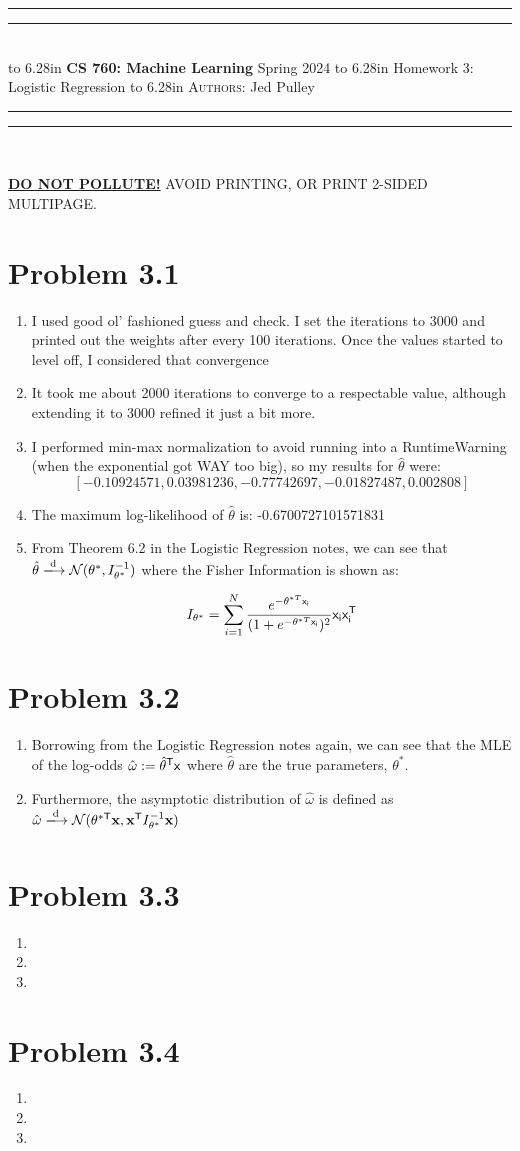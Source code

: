 \documentclass{article}
\newcommand{\lecture}[2]{
\pagestyle{myheadings}
\thispagestyle{plain}
\newpage
\noindent
\begin{center}
\rule{\textwidth}{1.6pt}\vspace*{-\baselineskip}\vspace*{2pt} %
\rule{\textwidth}{0.4pt}\\[1\baselineskip] %
\vbox{\vspace{2mm}
\hbox to 6.28in { {\bf CS 760: Machine Learning} \hfill Spring 2024 }
\vspace{4mm}
\hbox to 6.28in { {\Large \hfill #1  \hfill} }
\vspace{4mm}
\hbox to 6.28in { {\scshape Authors:}  #2 \hfill }}
\vspace{-2mm}
\rule{\textwidth}{0.4pt}\vspace*{-\baselineskip}\vspace{3.2pt} %
\rule{\textwidth}{1.6pt}\\[\baselineskip] %
\end{center}
\vspace*{4mm}
}
\begin{document}
\lecture{Homework 3: Logistic Regression}{Jed Pulley}

\begin{center}
{\Large {\sf \underline{\textbf{DO NOT POLLUTE!}} AVOID PRINTING, OR PRINT 2-SIDED MULTIPAGE.}}
\end{center}

\section*{Problem 3.1}
\begin{enumerate}[label=(\alph*)]
  \item I used good ol' fashioned guess and check. I set the iterations to 3000 and printed out the weights after every 100 iterations. Once the values started to level off, I considered that convergence
  \item It took me about 2000 iterations to converge to a respectable value, although extending it to 3000 refined it just a bit more.
  \item I performed min-max normalization to avoid running into a RuntimeWarning (when the exponential got WAY too big), so my results for $\hat{\theta}$ were: \[[-0.10924571, 0.03981236, -0.77742697, -0.01827487, 0.002808]\]
  \item The maximum log-likelihood of $\hat{\theta}$ is: -0.6700727101571831
  \item From Theorem 6.2 in the Logistic Regression notes, we can see that $\hat{\theta} \xlongrightarrow[\text{}]{\text{d}} \mathcal{N}(\theta^*, I^{-1}_{\theta^*})$ where the Fisher Information is shown as: \[I_{\theta^*} = \sum_{i=1}^{N}\frac{e^{-\theta^{*T}\sf{x}_i}}{(1 + e^{-\theta^{*T}\sf{x}_i})^2}\sf{x}_i\sf{x}^{\sf{T}}_i\]
\end{enumerate}

\section*{Problem 3.2}
\begin{enumerate}[label=(\alph*)]
  \item Borrowing from the Logistic Regression notes again, we can see that the MLE of the log-odds $\hat{\omega} := \hat{\theta}^{\sf{T}}\sf{x}$ where $\hat{\theta}$ are the true parameters, $\theta^*$.
  \item Furthermore, the asymptotic distribution of $\hat{\omega}$ is defined as $\hat{\omega} \xlongrightarrow[\text{}]{\text{d}} \mathcal{N}(\theta^{*\sf{T}}\textbf{x}, \textbf{x}^{\sf{T}}I^{-1}_{\theta^*}\textbf{x})$
\end{enumerate}

\section*{Problem 3.3}
\begin{enumerate}[label=(\alph*)]
  \item 
  \item 
  \item 
\end{enumerate}

\section*{Problem 3.4}
\begin{enumerate}[label=(\alph*)]
  \item 
  \item 
  \item 
\end{enumerate}
\end{document}
